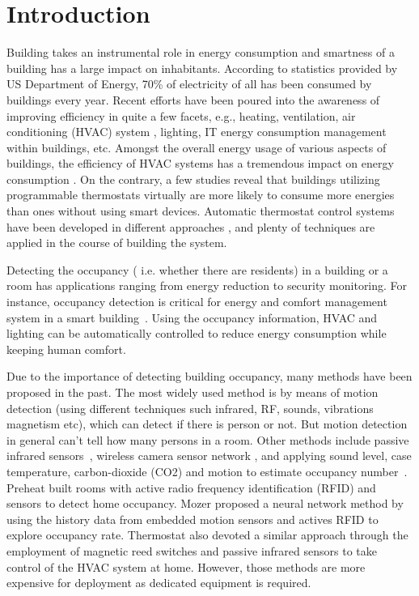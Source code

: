 \section{Introduction}
Building takes an instrumental role in energy consumption and
smartness of a building has a large impact on inhabitants. According
to statistics provided by US Department of Energy, 70\% of electricity
of all has been consumed by buildings every year. Recent efforts have
been poured into the awareness of improving efficiency in quite a few
facets, e.g., heating, ventilation, air conditioning (HVAC) system
\cite{10}\cite{12}, lighting\cite{8}, IT energy consumption management
within buildings\cite{1}\cite{2}, etc. Amongst the overall energy
usage of various aspects of buildings, the efficiency of HVAC systems
has a tremendous impact on energy consumption \cite{83}. On the
contrary, a few studies \cite{86} reveal that buildings utilizing
programmable thermostats virtually are more likely to consume more
energies than ones without using smart devices. Automatic thermostat
control systems have been developed in different approaches
\cite{87}\cite{88}, and plenty of techniques are applied in the course
of building the system.

Detecting the occupancy ( i.e. whether there are residents) in a
building or a room has applications ranging from energy reduction
to security monitoring.
For instance, occupancy detection is critical for energy and comfort management
system in a smart building~\cite{Nguyen2013Energy}.
Using the occupancy information, HVAC and lighting can be
automatically controlled to reduce energy consumption while keeping
human comfort.

Due to the importance of detecting building occupancy, many methods
have been proposed in the past. The most widely used method is by
means of motion detection (using different techniques such infrared,
RF, sounds, vibrations magnetism etc), which can detect if there is
person or not. But motion detection in general can't tell how many
persons in a room.  Other methods include passive infrared
sensors~\cite{Dodier2006Building}, wireless camera sensor network
\cite{Erickson2009Energy}, and applying sound level, case temperature,
carbon-dioxide (CO2) and motion to estimate occupancy
number~\cite{Ekwevugbe2013Real}.  Preheat \cite{8.10} built rooms with
active radio frequency identification (RFID) and sensors to detect
home occupancy. Mozer \cite{8.9} proposed a neural network method by
using the history data from embedded motion sensors and actives RFID
to explore occupancy rate. Thermostat \cite{8.11} also devoted a
similar approach through the employment of magnetic reed switches and
passive infrared sensors to take control of the HVAC system at
home. However, those methods are more expensive for deployment as
dedicated equipment is required.

